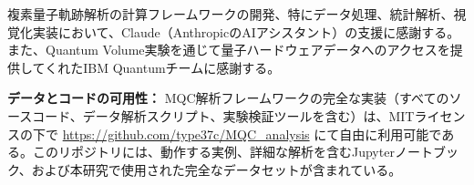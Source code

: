 \documentclass[a4paper,11pt]{article}
\begin{document}
\begin{CJK}{UTF8}{min}
複素量子軌跡解析の計算フレームワークの開発、特にデータ処理、統計解析、視覚化実装において、Claude（AnthropicのAIアシスタント）の支援に感謝する。また、Quantum Volume実験を通じて量子ハードウェアデータへのアクセスを提供してくれたIBM Quantumチームに感謝する。

\textbf{データとコードの可用性：} MQC解析フレームワークの完全な実装（すべてのソースコード、データ解析スクリプト、実験検証ツールを含む）は、MITライセンスの下で \url{https://github.com/type37c/MQC_analysis} にて自由に利用可能である。このリポジトリには、動作する実例、詳細な解析を含むJupyterノートブック、および本研究で使用された完全なデータセットが含まれている。

\end{CJK}
\end{document}
